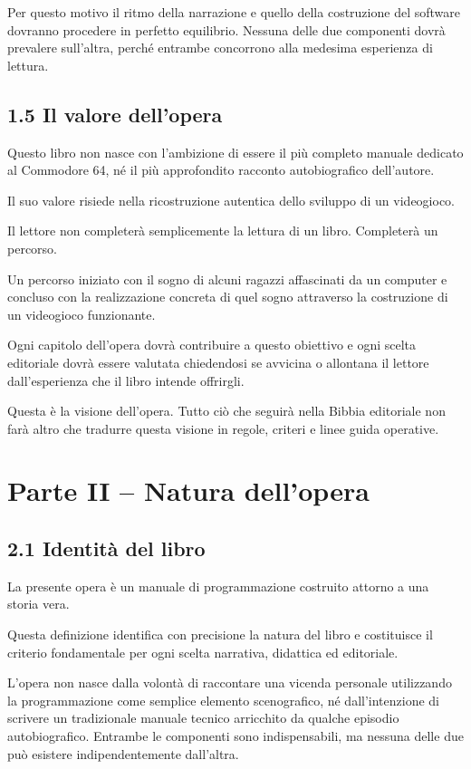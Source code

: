 \documentclass{article}
\begin{document}
Per questo motivo il ritmo della narrazione e quello della costruzione del software dovranno procedere in perfetto
equilibrio. Nessuna delle due componenti dovrà prevalere sull'altra, perché entrambe concorrono alla medesima
esperienza di lettura.

\subsection[1.5 Il valore dell{}'opera]{1.5 Il valore dell'opera}
Questo libro non nasce con l'ambizione di essere il più completo manuale dedicato al Commodore 64, né il più
approfondito racconto autobiografico dell'autore.

Il suo valore risiede nella ricostruzione autentica dello sviluppo di un videogioco.

Il lettore non completerà semplicemente la lettura di un libro. Completerà un percorso.

Un percorso iniziato con il sogno di alcuni ragazzi affascinati da un computer e concluso con la realizzazione concreta
di quel sogno attraverso la costruzione di un videogioco funzionante.

Ogni capitolo dell'opera dovrà contribuire a questo obiettivo e ogni scelta editoriale dovrà essere valutata chiedendosi
se avvicina o allontana il lettore dall'esperienza che il libro intende offrirgli.

Questa è la visione dell'opera. Tutto ciò che seguirà nella Bibbia editoriale non farà altro che tradurre questa visione
in regole, criteri e linee guida operative.

\section[Parte II – Natura dell{}'opera]{Parte II – Natura dell'opera}
\subsection{2.1 Identità del libro}
La presente opera è un manuale di programmazione costruito attorno a una storia vera.

Questa definizione identifica con precisione la natura del libro e costituisce il criterio fondamentale per ogni scelta
narrativa, didattica ed editoriale.

L'opera non nasce dalla volontà di raccontare una vicenda personale utilizzando la programmazione come semplice elemento
scenografico, né dall'intenzione di scrivere un tradizionale manuale tecnico arricchito da qualche episodio
autobiografico. Entrambe le componenti sono indispensabili, ma nessuna delle due può esistere indipendentemente
dall'altra.
\end{document}
